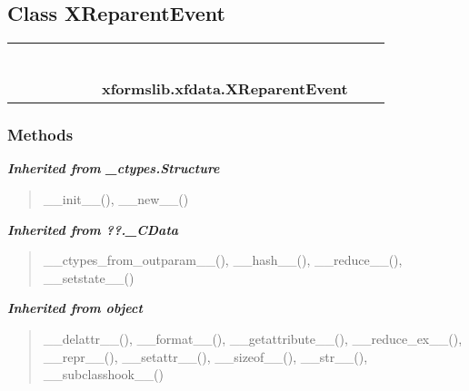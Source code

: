 \subsection{Class XReparentEvent}

    \label{xformslib:xfdata:XReparentEvent}
\begin{tabular}{cccccccccc}
\multicolumn{2}{r}{\settowidth{\BCL}{object}\multirow{2}{\BCL}{object}}
&&
&&
&&
  \\\cline{3-3}
  &&\multicolumn{1}{c|}{}
&&
&&
&&
  \\
\multicolumn{4}{r}{\settowidth{\BCL}{??.\_CData}\multirow{2}{\BCL}{??.\_CData}}
&&
&&
  \\\cline{5-5}
  &&&&\multicolumn{1}{c|}{}
&&
&&
  \\
\multicolumn{6}{r}{\settowidth{\BCL}{\_ctypes.Structure}\multirow{2}{\BCL}{\_ctypes.Structure}}
&&
  \\\cline{7-7}
  &&&&&&\multicolumn{1}{c|}{}
&&
  \\
&&&&&&\multicolumn{2}{l}{\textbf{xformslib.xfdata.XReparentEvent}}
\end{tabular}



  \subsubsection{Methods}


\large{\textbf{\textit{Inherited from \_ctypes.Structure}}}

\begin{quote}
\_\_init\_\_(), \_\_new\_\_()
\end{quote}

\large{\textbf{\textit{Inherited from ??.\_CData}}}

\begin{quote}
\_\_ctypes\_from\_outparam\_\_(), \_\_hash\_\_(), \_\_reduce\_\_(), \_\_setstate\_\_()
\end{quote}

\large{\textbf{\textit{Inherited from object}}}

\begin{quote}
\_\_delattr\_\_(), \_\_format\_\_(), \_\_getattribute\_\_(), \_\_reduce\_ex\_\_(), \_\_repr\_\_(), \_\_setattr\_\_(), \_\_sizeof\_\_(), \_\_str\_\_(), \_\_subclasshook\_\_()
\end{quote}

